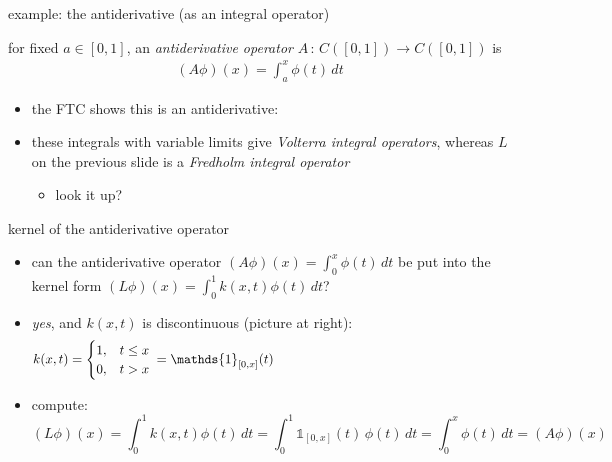 \documentclass[10pt,
               svgnames,
               hyperref={colorlinks,
                         citecolor=DeepPink4,
                         linkcolor=FireBrick,
                         urlcolor=Maroon},
               usepdftitle=false]{beamer}
\newcommand{\one}{\mathds{1}}
\begin{document}
\begin{frame}{example: the antiderivative (as an integral operator)}

\begin{definition}
for fixed $a\in [0,1]$, an \emph{antiderivative operator} \quad $A \,:\, C([0,1]) \to C([0,1])$ \quad is
\begin{gather*}
(A\phi)(x) = \int_a^x \phi(t)\,dt
\end{gather*}
\end{definition}

\begin{itemize}
\item the FTC shows this is an antiderivative:

\vspace{30mm}
\item these integrals with variable limits give \emph{Volterra integral operators}, whereas $L$ on the previous slide is a \emph{Fredholm integral operator}

{\footnotesize
\begin{itemize}
\item look it up?
\end{itemize}
}
\end{itemize}
\end{frame}


\begin{frame}{kernel of the antiderivative operator}

\begin{itemize}
\item can the antiderivative operator $(A\phi)(x) = \int_0^x \phi(t)\,dt$ be put into the kernel form $(L\phi)(x) = \int_0^1 k(x,t) \phi(t)\,dt$?

\medskip
\item \emph{yes}, and $k(x,t)$ is discontinuous (picture at right):
    $$k(x,t) = \begin{cases} 1, & t \le x \\ 0, & t>x \end{cases}\, = \one_{[0,x]}(t) \hspace{70mm}$$

\vspace{20mm}
\item compute:
    $$(L\phi)(x) = \int_0^1 k(x,t) \phi(t)\,dt = \int_0^1 \one_{[0,x]}(t)\, \phi(t)\,dt = \int_0^x \phi(t)\,dt = (A\phi)(x)$$
\end{itemize}
\end{frame}
\end{document}
